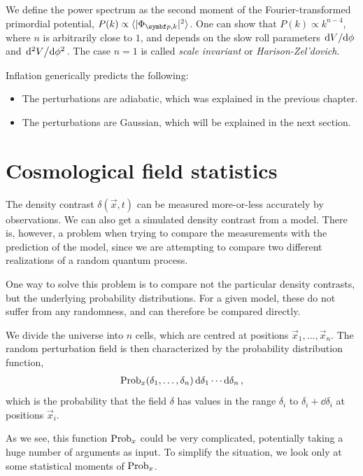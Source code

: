 We define the power spectrum as the second moment of the Fourier-transformed primordial potential, $P(k) \propto \langle{\abs{\Phi_{\vec{p},k}}^2}\rangle$. One can show that $P(k) \propto k^{n-4}$, where $n$ is arbitrarily close to $1$, and depends on the slow roll parameters $\dv*{V}{\phi}$ and $\dv*[2]{V}{\phi}$. The case $n=1$ is called \emph{scale invariant} or \emph{Harison-Zel'dovich}.

Inflation generically predicts the following:
\begin{itemize}
	\item The perturbations are adiabatic, which was explained in the previous chapter.
	\item The perturbations are Gaussian, which will be explained in the next section.
\end{itemize}




\section{Cosmological field statistics}
The density contrast $\delta(\vec{x}, t)$ can be measured more-or-less accurately by observations. We can also get a simulated density contrast from a model. There is, however, a problem when trying to compare the measurements with the prediction of the model, since we are attempting to compare two different realizations of a random quantum process. 

One way to solve this problem is to compare not the particular density contrasts, but the underlying probability distributions. For a given model, these do not suffer from any randomness, and can therefore be compared directly.

We divide the universe into $n$ cells, which are centred at positions $\vec{x}_1, \dots, \vec{x}_n$. The random perturbation field is then characterized by the probability distribution function,
\begin{align*}
	\operatorname{Prob}_x(\delta_1, \dots, \delta_n) \dd{\delta_1} \cdots \dd{\delta_n},
\end{align*}
which is the probability that the field $\delta$ has values in the range $\delta_i$ to $\delta_i + \dd{\delta_i}$ at positions $\vec{x}_i$.

As we see, this function $\operatorname{Prob}_x$ could be very complicated, potentially taking a huge number of arguments as input. To simplify the situation, we look only at some statistical moments of $\operatorname{Prob}_x$.


